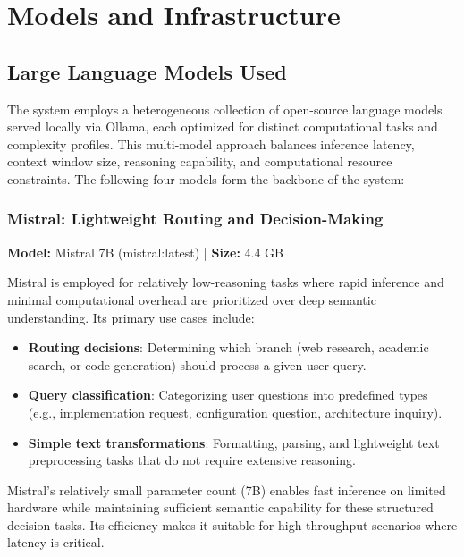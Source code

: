 \section{Models and Infrastructure}

\subsection{Large Language Models Used}

The system employs a heterogeneous collection of open-source language models served locally via Ollama, each optimized for distinct computational tasks and complexity profiles. This multi-model approach balances inference latency, context window size, reasoning capability, and computational resource constraints. The following four models form the backbone of the system:

\subsubsection{Mistral: Lightweight Routing and Decision-Making}

\textbf{Model:} Mistral 7B (mistral:latest) | \textbf{Size:} 4.4 GB 

Mistral is employed for relatively low-reasoning tasks where rapid inference and minimal computational overhead are prioritized over deep semantic understanding. Its primary use cases include:

\begin{itemize}
    \item \textbf{Routing decisions}: Determining which branch (web research, academic search, or code generation) should process a given user query.
    
    \item \textbf{Query classification}: Categorizing user questions into predefined types (e.g., implementation request, configuration question, architecture inquiry).
    
    \item \textbf{Simple text transformations}: Formatting, parsing, and lightweight text preprocessing tasks that do not require extensive reasoning.
\end{itemize}

Mistral's relatively small parameter count (7B) enables fast inference on limited hardware while maintaining sufficient semantic capability for these structured decision tasks. Its efficiency makes it suitable for high-throughput scenarios where latency is critical.

